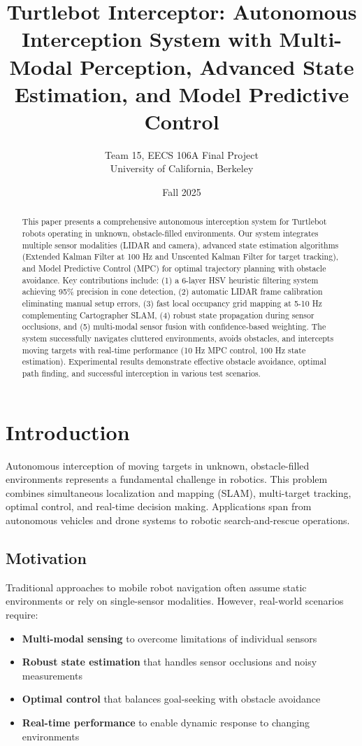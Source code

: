 \documentclass[11pt,a4paper]{article}
\title{\textbf{Turtlebot Interceptor: Autonomous Interception System with Multi-Modal Perception, Advanced State Estimation, and Model Predictive Control}}
\author{Team 15, EECS 106A Final Project\\University of California, Berkeley}
\date{Fall 2025}
\begin{document}
\maketitle

\begin{abstract}
This paper presents a comprehensive autonomous interception system for Turtlebot robots operating in unknown, obstacle-filled environments. Our system integrates multiple sensor modalities (LIDAR and camera), advanced state estimation algorithms (Extended Kalman Filter at 100 Hz and Unscented Kalman Filter for target tracking), and Model Predictive Control (MPC) for optimal trajectory planning with obstacle avoidance. Key contributions include: (1) a 6-layer HSV heuristic filtering system achieving 95\% precision in cone detection, (2) automatic LIDAR frame calibration eliminating manual setup errors, (3) fast local occupancy grid mapping at 5-10 Hz complementing Cartographer SLAM, (4) robust state propagation during sensor occlusions, and (5) multi-modal sensor fusion with confidence-based weighting. The system successfully navigates cluttered environments, avoids obstacles, and intercepts moving targets with real-time performance (10 Hz MPC control, 100 Hz state estimation). Experimental results demonstrate effective obstacle avoidance, optimal path finding, and successful interception in various test scenarios.
\end{abstract}

\section{Introduction}

Autonomous interception of moving targets in unknown, obstacle-filled environments represents a fundamental challenge in robotics. This problem combines simultaneous localization and mapping (SLAM), multi-target tracking, optimal control, and real-time decision making. Applications span from autonomous vehicles and drone systems to robotic search-and-rescue operations.

\subsection{Motivation}

Traditional approaches to mobile robot navigation often assume static environments or rely on single-sensor modalities. However, real-world scenarios require:
\begin{itemize}
    \item \textbf{Multi-modal sensing} to overcome limitations of individual sensors
    \item \textbf{Robust state estimation} that handles sensor occlusions and noisy measurements
    \item \textbf{Optimal control} that balances goal-seeking with obstacle avoidance
    \item \textbf{Real-time performance} to enable dynamic response to changing environments
\end{itemize}
\end{document}
